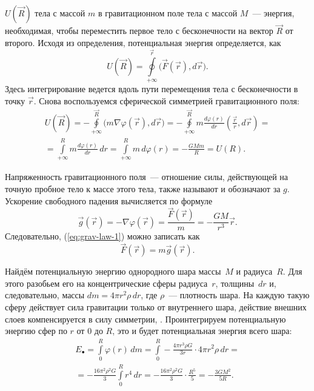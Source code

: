  $U(\vec{R})$ тела с массой $m$ в гравитационном поле тела с массой $M$~--- энергия, необходимая, чтобы переместить первое тело с бесконечности на вектор $\vec{R}$ от второго. Исходя из определения, потенциальная энергия определяется, как
\begin{equation}
    U(\vec R) =  \oint\limits_{+\infty}^\vec{r} \big(\vec F( \vec r),d \vec r\big).
\end{equation}
Здесь интегрирование ведется вдоль пути перемещения тела с бесконечности в точку $\vec{r}$. Снова воспользуемся сферической симметрией гравитационного поля:
\begin{multline}
    U(\vec R) 
    = - \oint\limits_{+\infty}^\vec{R} \big(m \nabla \varphi (\vec{r}), d \vec r\big)
    = - \oint\limits_{+\infty}^\vec{R} m \frac{d \varphi(r)}{d r} \left( \frac{\vec r}{r}, d \vec r \right) = \\
    = \int\limits_{+\infty}^R m \frac{d \varphi(r)}{d r} \,d r 
    = \int\limits_{+\infty}^R m \, d \varphi(r) = -\frac{GMm}{R} = U(R).
\end{multline}

Напряженность гравитационного поля~--- отношение силы, действующей на точную пробное тело к массе этого тела, также называют  и обозначают за $g$. Ускорение свободного падения вычисляется по формуле
\begin{equation}
    \vec g(\vec r) = -\nabla \varphi(\vec r) = \frac{\vec F( \vec r)}{m} = - \frac{GM}{r^3} \vec r.
    \label{eq:g}
\end{equation} 
Следовательно, (\ref{eq:grav-law-1}) можно записать как
\begin{equation}
    \vec F (\vec r) = m \vec g(\vec r).
\end{equation}

Найдём потенциальную энергию однородного шара массы~$M$ и радиуса~$R$. Для этого разобьем его на концентрические сферы радиуса~$r$, толщины~$dr$ и, следовательно, массы $dm = 4 \pi r^2 \rho \, dr$, где $\rho$~--- плотность шара. На каждую такую сферу действует сила гравитации только от внутреннего шара, действие внешних слоев компенсируется в силу симметрии, . Проинтегрируем потенциальную энергию сфер по $r$ от 0 до $R$, это и будет потенциальная энергия всего шара:
\begin{multline}
    E_\bullet 
        = \int\limits_0^R \varphi(r) \, dm 
        = \int\limits_0^R -\frac{4 \pi r^3 \rho G}{3 r} \cdot 4 \pi r^2 \rho \, dr =\\
        = -\frac{16\pi^2 \rho^2 G}{3} \int\limits_0^R r^4 \, dr 
        = -\frac{16 \pi^2 \rho^2 G}{3} \cdot \frac{R^5}{5} 
        = - \frac{3 G M^2}{5R}.
\end{multline}

